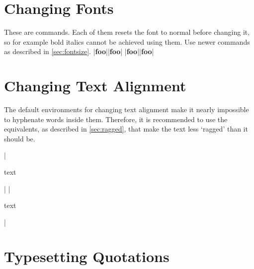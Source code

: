 \section{Changing Fonts}

These are  commands. Each of them resets the font to normal
before changing it, so for example bold italics cannot be achieved using them.
Use newer commands as described in \autoref{sec:fontsize}.
\chto|{\bf foo}||\textbf{foo}|
\chto|{\bf foo}||{\bfseries foo}|

\section{Changing Text Alignment}

The default  environments for changing text alignment make it
nearly impossible to hyphenate words inside them. Therefore, it is recommended
to use the  equivalents, as described in
\autoref{sec:ragged}, that make the text less \enquote*{ragged} than it
should be.
\begin{chktexignore}  
\chto|\begin{center}
  text
\end{center}|
|\usepackage{ragged2e}
\begin{Center}
  text
\end{Center}|
\end{chktexignore}

\section{Typesetting Quotations}


